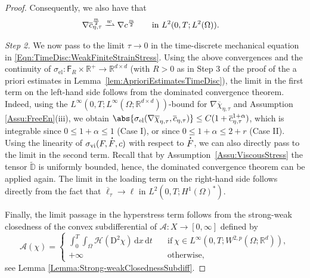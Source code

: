 \documentclass[a4paper,12pt]{article}
\newcommand{\el}{\text{el}}
\newcommand{\vi}{\text{vi}}
\newcommand{\R}{\mathbb{R}}
\newcommand{\wb}{\overline}
\newcommand{\dx}{\mathrm{\,d}x}
\newcommand{\dt}{\mathrm{\,d}t}
\newcommand{\chibar}{\overline{\chi}}
\newcommand{\cbar}{\overline{c}}
\newcommand\DT[1]{\mathchoice
                 {{\buildrel{\hspace*{.1em}\text{\LARGE.}}\over{#1}}}
                 {{\buildrel{\hspace*{.1em}\text{\Large.}}\over{#1}}}
                 {{\buildrel{\hspace*{.1em}\text{\large.}}\over{#1}}}
                 {{\buildrel{\hspace*{.1em}\text{\large.}}\over{#1}}}}
\renewcommand{\dot}{\DT}
\newcommand{\rmD}{\mathrm{D}}
\newcommand{\wto}{\xrightharpoonup{w}}
\theoremstyle{plain}
\theoremstyle{definition}
\numberwithin{equation}{section}
\begin{document}
\begin{proof}
Consequently, we also have that 
\begin{alignat*}{2}
            &\nabla \cbar_{\eta,\tau}^{\frac{m}{2}} \wto \nabla c^{\frac{m}{2}}\quad &&\text{in}\ L^2(0,T;L^2(\Omega)).
   \end{alignat*}



\medskip

		
		
\emph{Step 2.}
We now pass to the limit $\tau\to 0$ in the time-discrete mechanical equation
in \eqref{Eqn:TimeDisc:WeakFiniteStrainStress}. Using the above convergences and the continuity of $\sigma_\el:\mathsf{F}_R\times \R^+\to \R^{d\times d}$
(with $R>0$ as in Step 3 of the proof of the a priori estimates in Lemma~\ref{lem:AprioriEstimatesTimeDisc}), 
the limit in the first term on the left-hand side 
follows from the dominated convergence theorem. Indeed, using the 
$L^\infty(0,T;L^\infty(\Omega;\R^{d\times d}))$-bound for $\nabla\chibar_{\eta,\tau}$ and Assumption \ref{Assu:FreeEn}(iii), we obtain $\abs{\sigma_\el(\nabla\chibar_{\eta,\tau},\cbar_{\eta,\tau})}\leq C(1+\cbar_{\eta,\tau}^{1+\alpha})$,  which is integrable since $0\leq 1+\alpha\leq 1$ (Case I), or since $0\leq 1+\alpha\leq 2+r$ (Case II). 
Using the linearity of $\sigma_\vi(F,\dot F,c)$ 
with respect to $\dot F$, we can also directly pass to the 
limit in the second term. Recall that by Assumption~\ref{Assu:ViscousStress}
the tensor $\widetilde{\mathbb{D}}$ is uniformly bounded, hence, 
the dominated convergence theorem can be applied again. 
The limit in the loading term on the right-hand side follows
directly from the fact that $\wb\ell_\tau\to \ell$ in $L^2(0,T;H^1(\Omega)^*)$. 

Finally, the limit passage in the hyperstress term follows from 
the strong-weak closedness of the convex subdifferential
of $\mathcal{A}:X\to [0,\infty]$ defined by 
\begin{equation*}
\mathcal{A}(\chi) = \begin{cases}
\int_0^T\int_\Omega \mathscr{H}(\rmD^2\chi)\dx\dt\quad &\text{if}\ \chi\in L^\infty(0,T;W^{2,p}(\Omega;\R^d)),\\
+\infty &\text{otherwise},
\end{cases}
\end{equation*}
see Lemma \ref{Lemma:Strong-weakClosednessSubdiff}.
\medskip


\end{proof}
\end{document}
